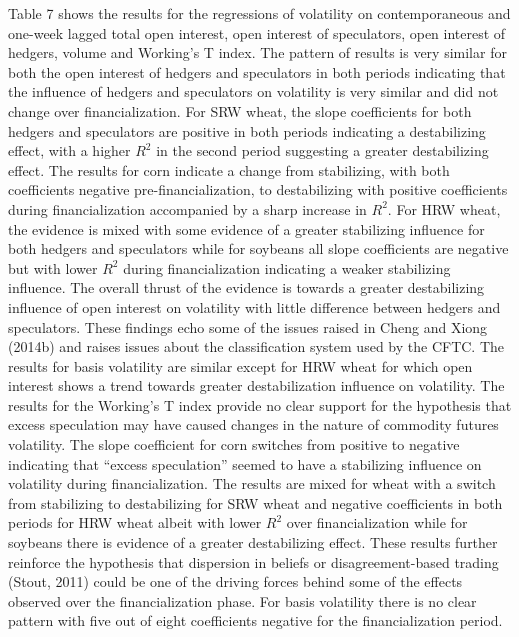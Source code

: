 \documentclass[]{elsarticle} %
\begin{document}
Table 7 shows the results for the regressions of volatility on
contemporaneous and one-week lagged total open interest, open interest
of speculators, open interest of hedgers, volume and Working's T index.
The pattern of results is very similar for both the open interest of
hedgers and speculators in both periods indicating that the influence of
hedgers and speculators on volatility is very similar and did not change
over financialization. For SRW wheat, the slope coefficients for both
hedgers and speculators are positive in both periods indicating a
destabilizing effect, with a higher \(R^{2}\) in the second period
suggesting a greater destabilizing effect. The results for corn indicate
a change from stabilizing, with both coefficients negative
pre-financialization, to destabilizing with positive coefficients during
financialization accompanied by a sharp increase in \(R^{2}\). For HRW
wheat, the evidence is mixed with some evidence of a greater stabilizing
influence for both hedgers and speculators while for soybeans all slope
coefficients are negative but with lower \(R^{2}\) during
financialization indicating a weaker stabilizing influence. The overall
thrust of the evidence is towards a greater destabilizing influence of
open interest on volatility with little difference between hedgers and
speculators. These findings echo some of the issues raised in Cheng and
Xiong (2014b) and raises issues about the classification system used by
the CFTC. The results for basis volatility are similar except for HRW
wheat for which open interest shows a trend towards greater
destabilization influence on volatility. The results for the Working's T
index provide no clear support for the hypothesis that excess
speculation may have caused changes in the nature of commodity futures
volatility. The slope coefficient for corn switches from positive to
negative indicating that ``excess speculation'' seemed to have a
stabilizing influence on volatility during financialization. The results
are mixed for wheat with a switch from stabilizing to destabilizing for
SRW wheat and negative coefficients in both periods for HRW wheat albeit
with lower \(R^{2}\) over financialization while for soybeans there is
evidence of a greater destabilizing effect. These results further
reinforce the hypothesis that dispersion in beliefs or
disagreement-based trading (Stout, 2011) could be one of the driving
forces behind some of the effects observed over the financialization
phase. For basis volatility there is no clear pattern with five out of
eight coefficients negative for the financialization period.
\end{document}
